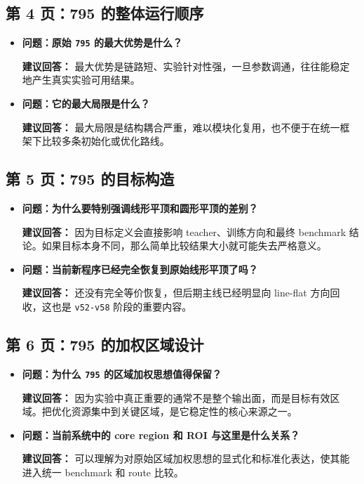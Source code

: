 \documentclass[12pt,a4paper]{ctexart}
\begin{document}
\subsection{第 4 页：795 的整体运行顺序}
\begin{itemize}
\item \textbf{问题：原始 \texttt{795} 的最大优势是什么？}

\textbf{建议回答：} 最大优势是链路短、实验针对性强，一旦参数调通，往往能稳定地产生真实实验可用结果。

\item \textbf{问题：它的最大局限是什么？}

\textbf{建议回答：} 最大局限是结构耦合严重，难以模块化复用，也不便于在统一框架下比较多条初始化或优化路线。
\end{itemize}

\subsection{第 5 页：795 的目标构造}
\begin{itemize}
\item \textbf{问题：为什么要特别强调线形平顶和圆形平顶的差别？}

\textbf{建议回答：} 因为目标定义会直接影响 teacher、训练方向和最终 benchmark 结论。如果目标本身不同，那么简单比较结果大小就可能失去严格意义。

\item \textbf{问题：当前新程序已经完全恢复到原始线形平顶了吗？}

\textbf{建议回答：} 还没有完全等价恢复，但后期主线已经明显向 line-flat 方向回收，这也是 \texttt{v52-v58} 阶段的重要内容。
\end{itemize}

\subsection{第 6 页：795 的加权区域设计}
\begin{itemize}
\item \textbf{问题：为什么 \texttt{795} 的区域加权思想值得保留？}

\textbf{建议回答：} 因为实验中真正重要的通常不是整个输出面，而是目标有效区域。把优化资源集中到关键区域，是它稳定性的核心来源之一。

\item \textbf{问题：当前系统中的 core region 和 ROI 与这里是什么关系？}

\textbf{建议回答：} 可以理解为对原始区域加权思想的显式化和标准化表达，使其能进入统一 benchmark 和 route 比较。
\end{itemize}
\end{document}
